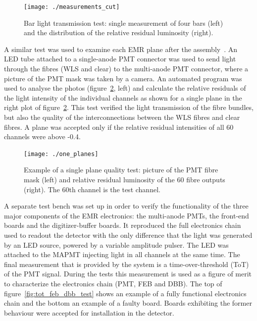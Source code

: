 \documentclass[a4paper,11pt]{article}
\begin{document}
\begin{figure}[htb]
 \centering
 \texttt{[image: ./measurements\_cut]}
 \caption[Bar quality test measurements]{Bar light transmission test: single measurement of four bars (left) and the distribution of the relative residual
 luminosity (right).}
 \label{fig:measurements}
\end{figure}

A similar test was used to examine each EMR plane after the assembly~\cite{emr_elquality}. An LED tube attached to a single-anode PMT connector was used
to send light through the fibres (WLS and clear) to the multi-anode PMT connector, where a picture of the PMT mask was taken by a camera. An automated
program was used to analyse the photos (figure~\ref{fig:plane_tests_one_planes}, left) and calculate the relative residuals of the light intensity
of the individual channels as shown for a single plane in the right plot of figure~\ref{fig:plane_tests_one_planes}. This test verified the light
transmission of the fibre bundles, but also the quality of the interconnections between the WLS fibres and clear fibres. A plane was accepted only if
the relative residual intensities of all 60 channels were above -0.4.

\begin{figure}[htb]
 \centering
 \texttt{[image: ./one\_planes]}
 \caption[Example of plane quality tests]{Example of a single plane quality test: picture of the PMT fibre mask (left) and relative residual luminosity
 of the 60 fibre outputs (right). The 60th channel is the test channel.}
 \label{fig:plane_tests_one_planes}
\end{figure}

A separate test bench was set up in order to verify the functionality of the three major components of the EMR electronics: the multi-anode PMTs, the 
front-end boards and the digitizer-buffer boards. It reproduced the full electronics chain used to readout the detector with the only difference that the
light was generated by an LED source, powered by a variable amplitude pulser. The LED was attached to the MAPMT injecting light in all channels at the
same time. The final measurement that is provided by the system is a time-over-threshold (ToT) of the PMT signal. During the tests this measurement is used as
a figure of merit to characterize the electronics chain (PMT, FEB and DBB). The top of figure~\ref{fig:tot_feb_dbb_test} shows an example of a fully
functional electronics chain and the bottom an example of a faulty board. Boards exhibiting the former behaviour were accepted for installation in the
detector.
\end{document}

